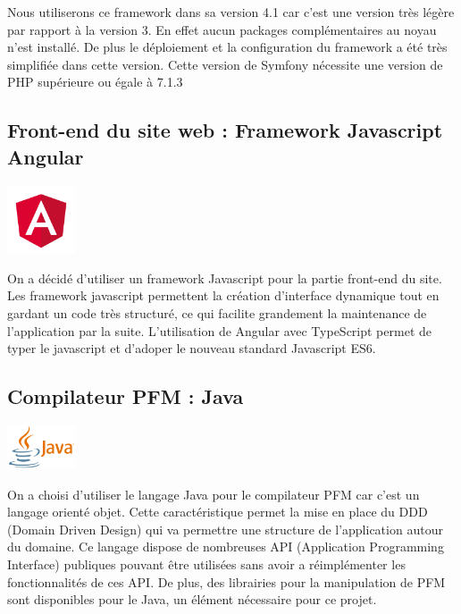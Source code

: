 \documentclass[12pt,a4paper]{article}
\begin{document}
\smallbreak

Nous utiliserons ce framework dans sa version 4.1 car c'est une version très légère par rapport à la version 3. 
En effet aucun packages complémentaires au noyau n'est installé. De plus le déploiement et la configuration du framework a été très simplifiée dans cette version.
Cette version de Symfony nécessite une version de PHP supérieure ou égale à 7.1.3

\subsection{Front-end du site web : Framework Javascript Angular}
\begin{center}
  \includegraphics[width=2cm]{img/angular.png}
\end{center}
On a décidé d'utiliser un framework Javascript pour la partie front-end du site.
Les framework javascript permettent la création d'interface dynamique tout en gardant un code très structuré, ce qui facilite grandement la maintenance de l'application par la suite.
L'utilisation de Angular avec TypeScript permet de typer le javascript et d'adoper le nouveau standard Javascript ES6.

\subsection{Compilateur PFM : Java}
\begin{center}
  \includegraphics[width=2cm]{img/java.png}
\end{center}
On a choisi d'utiliser le langage Java pour le compilateur PFM car c'est un langage orienté objet. 
Cette caractéristique permet la mise en place du DDD (Domain Driven Design) qui va permettre une structure de l'application autour du domaine.
Ce langage dispose de nombreuses API (Application Programming Interface) publiques pouvant être utilisées sans avoir a réimplémenter les fonctionnalités de ces API. 
De plus, des librairies pour la manipulation de PFM sont disponibles pour le Java, un élément nécessaire pour ce projet.
\end{document}
